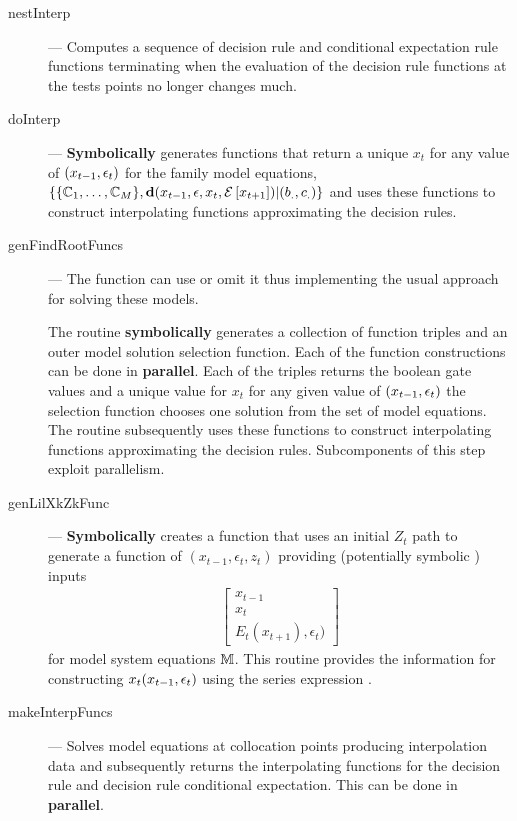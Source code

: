 \documentclass[12pt]{article}
\begin{document}
\begin{description}
\item[nestInterp] --- Computes a sequence of decision rule and conditional expectation rule functions terminating when the evaluation of the decision rule 
functions at the tests points no longer changes much.
\item[doInterp] --- {\bf Symbolically} generates functions that return a unique $x_t$ for any value of $(x_{t-1},\epsilon_t)$ for the family model equations, $\{\{\mathbb{C}_{1},\ldots,\mathbb{C}_{M}\},\mathbf{d}(x_{t-1},\epsilon,x_t,{\mathcal{E}\left [ x_{t+1} \right ]})|(b_.,c_.)\}$ and uses these functions to construct interpolating functions approximating the decision rules.
\item[genFindRootFuncs] --- 
The function can use  or omit it thus implementing the usual
approach for solving these models.

The routine {\bf symbolically} generates a collection of function triples
and an outer 
model solution selection function. 
Each of the function constructions can be done in {\bf parallel}.
Each of the triples
 returns the boolean gate values and a unique value for 
$x_t$ for any given value of $(x_{t-1},\epsilon_t)$ the selection function chooses 
one solution from the set of  model equations. The routine
 subsequently uses these 
functions to construct interpolating functions approximating the 
decision rules. Subcomponents of this step exploit parallelism.


\item[genLilXkZkFunc] --- {\bf Symbolically} creates a function that uses an initial $Z_t$ path to generate a function of $(x_{t-1},\epsilon_t,z_t)$ providing (potentially symbolic ) inputs 
  \begin{gather*}
    \begin{bmatrix}
x_{t-1}\\x_t\\E_t(x_{t+1}),\epsilon_t)    
    \end{bmatrix}
  \end{gather*}
 for model system equations $\mathbb{M}$.  This  routine  provides the 
information for constructing $x_t(x_{t-1},\epsilon_t)$ using the series expression .
\item[makeInterpFuncs] --- Solves model equations at collocation points 
producing interpolation data and subsequently returns the  
 interpolating functions for the decision rule and decision rule conditional expectation.  This can be done in {\bf parallel}.
\end{description}


\end{document}

